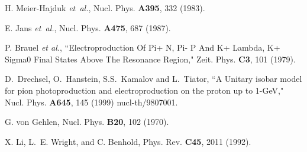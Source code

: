 \begin{thebibliography}{99}
H. Meier-Hajduk {\it et~al.}, Nucl. Phys. {\bf A395},  332  (1983).

E. Jans {\it et~al.}, Nucl. Phys. {\bf A475},  687  (1987).

 P. Brauel {\it et al.},
``Electroproduction Of Pi+ N, Pi- P And K+ Lambda, K+ Sigma0 Final States
                  Above The Resonance Region,"
Zeit. Phys. {\bf C3}, 101 (1979).

D.~Drechsel, O.~Hanstein, S.S.~Kamalov and L.~Tiator,
``A Unitary isobar model for pion photoproduction and electroproduction on
                  the proton up to 1-GeV,"
Nucl. Phys. {\bf A645}, 145 (1999)
nucl-th/9807001.

G. von Gehlen, Nucl. Phys. {\bf B20},  102  (1970).

X. Li, L.~E. Wright, and C. Benhold, Phys. Rev. {\bf C45},  2011  (1992).

\end{thebibliography}


